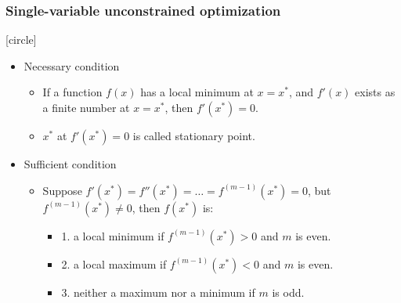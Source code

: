 \documentclass{beamer}
\begin{document}
\begin{frame}
    \frametitle{Single-variable unconstrained optimization}
    [circle]
    \begin{itemize}
        \item Necessary condition
        \begin{itemize}
            \item If a function $f(x)$ has a local minimum at $x=x^*$,
            and $f'(x)$ exists as a finite number at $x=x^*$, then $f'(x^*)=0.$
            \item $x^*$ at $f'(x^*)=0$ is called stationary point.
        \end{itemize}
        \item Sufficient condition
        \begin{itemize}
            \item Suppose $f'(x^*)=f''(x^*)=\dots =f^{(m-1)}(x^*)=0$,
            but $f^{(m-1)}(x^*)\neq 0$, then $f(x^*)$ is:
            \begin{itemize}
                \item 1. a local minimum if $f^{(m-1)}(x^*)>0$ and $m$ is even.
                \item 2. a local maximum if $f^{(m-1)}(x^*)<0$ and $m$ is even.
                \item 3. neither a maximum nor a minimum if $m$ is odd.
            \end{itemize}
        \end{itemize}     
    \end{itemize}
\end{frame}
\end{document}
